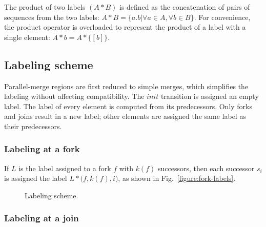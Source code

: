 \documentclass[conference]{IEEEtran}
\begin{document}
The product of two labels $(A * B)$ is
defined as the concatenation of pairs of sequences from the two
labels: $A*B = \{a.b |\forall a \in A, \forall b \in B \}$. For
convenience, the product operator is overloaded to represent the
product of a label with a single element: $A*b = A*\{[b]\}$.



\subsection{Labeling scheme}

Parallel-merge regions are first reduced to simple merges, which
simplifies the labeling without affecting compatibility. The $init$
transition is assigned an empty label. The label of every element is
computed from its predecessors. Only forks and joins result in a new
label; other elements are assigned the same label as their
predecessors.

\subsubsection{Labeling at a fork}

If $L$ is the label assigned to a fork $f$ with $k(f)$ successors,
then each successor $s_i$ is assigned the label $L *
\bigl(f,k(f),i\bigr)$, as shown in Fig.~\ref{figure:fork-labels}.

\begin{figure}[!t]
  \centering
  \caption{Labeling scheme.}
\end{figure}

\subsubsection{Labeling at a join}
\end{document}
